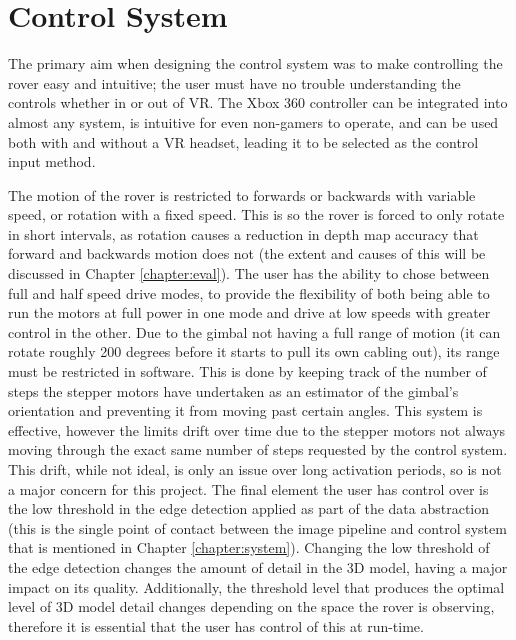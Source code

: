 \begin{table}[H]
\centering
\caption{Data Packet Format.}
\label{table:packet}
\end{table}

\section{Control System}

The primary aim when designing the control system was to make controlling the rover easy and intuitive; the user must have no trouble understanding the controls whether in or out of VR. The Xbox 360 controller can be integrated into almost any system, is intuitive for even non-gamers to operate, and can be used both with and without a VR headset, leading it to be selected as the control input method.

The motion of the rover is restricted to forwards or backwards with variable speed, or rotation with a fixed speed. This is so the rover is forced to only rotate in short intervals, as rotation causes a reduction in depth map accuracy that forward and backwards motion does not (the extent and causes of this will be discussed in Chapter \ref{chapter:eval}). The user has the ability to chose between full and half speed drive modes, to provide the flexibility of both being able to run the motors at full power in one mode and drive at low speeds with greater control in the other. Due to the gimbal not having a full range of motion (it can rotate roughly 200 degrees before it starts to pull its own cabling out), its range must be restricted in software. This is done by keeping track of the number of steps the stepper motors have undertaken as an estimator of the gimbal's orientation and preventing it from moving past certain angles. This system is effective, however the limits drift over time due to the stepper motors not always moving through the exact same number of steps requested by the control system. This drift, while not ideal, is only an issue over long activation periods, so is not a major concern for this project. The final element the user has control over is the low threshold in the edge detection applied as part of the data abstraction (this is the single point of contact between the image pipeline and control system that is mentioned in Chapter \ref{chapter:system}). Changing the low threshold of the edge detection changes the amount of detail in the 3D model, having a major impact on its quality. Additionally, the threshold level that produces the optimal level of 3D model detail changes depending on the space the rover is observing, therefore it is essential that the user has control of this at run-time.

